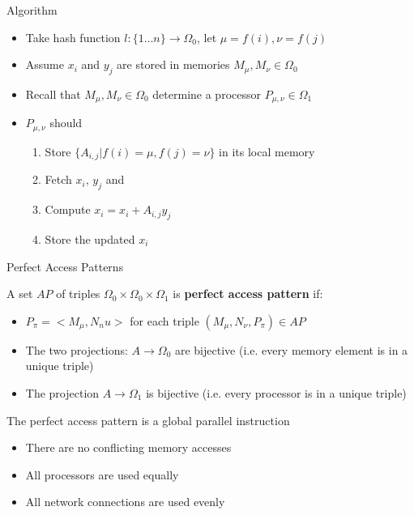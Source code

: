 \documentclass{beamer}
\begin{document}
  
  \begin{frame} {Algorithm}
  \begin{itemize}
  \item Take hash function $l:\{1 \dots n\} \rightarrow \Omega_0$, let $\mu=f(i), \nu=f(j)$
  \item Assume $x_i$ and $y_j$ are stored in memories $M_\mu,M_\nu \in \Omega_0$
  \item Recall that $M_\mu,M_\nu \in \Omega_0$ determine a processor $P_{\mu,\nu} \in \Omega_1$
  \item $P_{\mu,\nu}$ should
    \begin{enumerate} 
    \item Store $\{A_{i,j} | f(i) = \mu, f(j)=\nu\}$ in its local memory
    \item Fetch $x_i$, $y_j$ and 
    \item Compute $x_i = x_i + A_{i,j}y_j$
    \item Store the updated $x_i$
    \end{enumerate}
  \end{itemize}
\end{frame}

\begin{frame}{Perfect Access Patterns}
\begin{block}{A set $AP$ of triples $\Omega_0 \times \Omega_0 \times \Omega_1$ is  {\bf perfect access pattern} if:}
  \begin{itemize}
  \item $P_\pi = <M_\mu, N_nu>$ for each triple $(M_\mu, N_\nu, P_\pi) \in AP$ 
  \item The two projections: $A \rightarrow \Omega_0$ are bijective (i.e. every memory element is in a unique triple)
  \item The projection $A \rightarrow \Omega_1$ is bijective (i.e. every processor is in a unique triple)
  \end{itemize}
  \end{block}
  
  \begin{block}{The perfect access pattern is a global parallel instruction}
  \begin{itemize} 
  \item There are no conflicting memory accesses
  \item All processors are used equally
  \item All network connections are used evenly
  \end{itemize}
  \end{block}
\end{frame}
\end{document}
